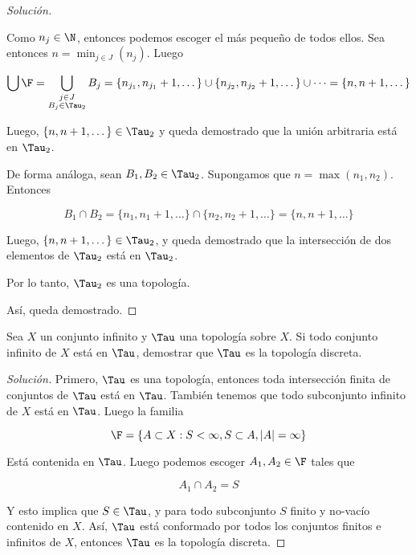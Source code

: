 \begin{proof}[Solución]
\begin{enumerate}
        Como $n_j \in \N$, entonces podemos escoger el más pequeño de todos ellos. Sea entonces $n = \min_{j \in J} (n_j)$. Luego
        
        \[
        \bigcup \F = \bigcup_{\substack{j \in J \\ B_j \in \Tau_2}} B_j = \{n_{j_1}, n_{j_1}+1, \dots \} \cup \{n_{j_2}, n_{j_2}+1, \dots \} \cup \dots = \{n, n+1, \dots\}
        \]
        
        Luego, $\{n, n+1, \dots\} \in \Tau_2$ y queda demostrado que la unión arbitraria está en $\Tau_2$.
        
        De forma análoga, sean $B_1, B_2 \in \Tau_2$. Supongamos que $n = \max (n_1, n_2)$. Entonces
        
        \[
        B_1 \cap B_2 = \{n_{1}, n_{1}+1, \dots \} \cap \{n_{2}, n_{2}+1, \dots \} = \{n, n+1, \dots\}
        \]
        
        Luego, $\{n, n+1, \dots\} \in \Tau_2$, y queda demostrado que la intersección de dos elementos de $\Tau_2$ está en $\Tau_2$.
        
        Por lo tanto, $\Tau_2$ es una topología.
    \end{enumerate}
    
    Así, queda demostrado.
\end{proof}

\begin{ejer}
    Sea $X$ un conjunto infinito y $\Tau$ una topología sobre $X$. Si todo conjunto infinito de $X$ está en $\Tau$, demostrar que $\Tau$ es la topología discreta.
\end{ejer}

\begin{proof}[Solución]
    Primero, $\Tau$ es una topología, entonces toda intersección finita de conjuntos de $\Tau$ está en $\Tau$. También tenemos que todo subconjunto infinito de $X$ está en $\Tau$. Luego la familia
    
    \[
    \F = \{A \subset X : S < \infty, S \subset A, |A| = \infty\}
    \]
    
    Está contenida en $\Tau$. Luego podemos escoger $A_1, A_2 \in \F$ tales que
    
    \[
    A_1 \cap A_2 = S
    \]
    
    Y esto implica que $S \in \Tau$, y para todo subconjunto $S$ finito y no-vacío contenido en $X$. Así, $\Tau$ está conformado por todos los conjuntos finitos e infinitos de $X$, entonces $\Tau$ es la topología discreta.
\end{proof}